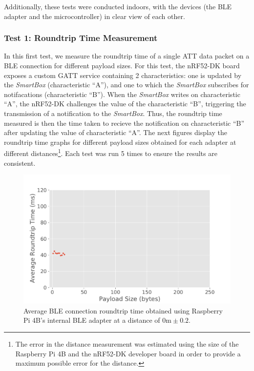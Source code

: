 Additionally, these tests were conducted indoors, with the devices (the \acs{BLE} adapter and the microcontroller) in clear view of each other.

\subsubsection{Test 1: Roundtrip Time Measurement}

In this first test, we measure the roundtrip time of a single \acs{ATT} data packet on a \acs{BLE} connection for different payload sizes. For this test, the nRF52-DK board exposes a custom \acs{GATT} service containing 2 characteristics: one is updated by the \textit{SmartBox} (characteristic ``A''), and one to which the \textit{SmartBox} subscribes for notifacations (characteristic ``B''). When the \textit{SmartBox} writes on characteristic ``A'', the nRF52-DK challenges the value of the characteristic ``B'', triggering the transmission of a notification to the \textit{SmartBox}. Thus, the roundtrip time measured is then the time taken to recieve the notification on characteristic ``B'' after updating the value of characteristic ``A''. The next figures display the roundtrip time graphs for different payload sizes obtained for each adapter at different distances\footnote{The error in the distance measurement was estimated using the size of the Raspberry Pi 4B and the nRF52-DK developer board in order to provide a maximum possible error for the distance.}. Each test was run 5 times to ensure the results are consistent.

\begin{figure}[H]
    \centering
    \includegraphics[width=0.75\linewidth]{images/ble-roundtrip-hci1-0cm.pdf}
    \caption[Average \acs{BLE} connection roundtrip time obtained using Raspberry Pi 4B's internal \acs{BLE} adapter at a distance of 0m.]{Average \acs{BLE} connection roundtrip time obtained using Raspberry Pi 4B's internal \acs{BLE} adapter at a distance of $0\text{m} \pm 0.2$.}
    \label{fig:ble-roundtrip-hci1-0m}
\end{figure}

